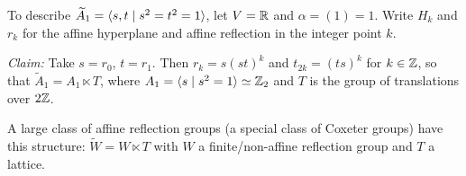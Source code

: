 To describe $\widetilde{A}_1 = \langle s, t \mid s^2 = t^2 = 1 \rangle$, let $V = \mathbb{R}$
and $\alpha = (1) = 1$. Write $H_k$ and $r_k$ for the affine hyperplane and
affine reflection in the integer point $k$.

{\em Claim:} Take $s = r_0$, $t = r_1$. Then $r_k = s(st)^k$ and $t_{2k}
= (ts)^k$ for $k \in \mathbb{Z}$, so that $\widetilde{A}_1 = A_1 \ltimes T$, where
$A_1 = \langle s \mid s^2 = 1 \rangle \simeq \mathbb{Z}_2$ and $T$ is the group of translations
over $2\mathbb{Z}$.

A large class of affine reflection groups (a special class of Coxeter groups)
have this structure: $\widetilde{W} = W \ltimes T$ with $W$ a finite/non-affine
reflection group and $T$ a lattice.

